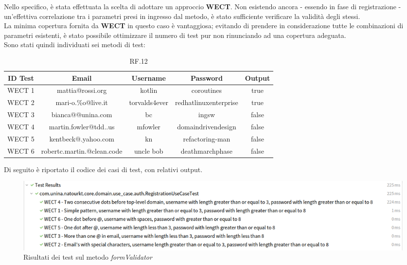 \documentclass{natourDoc}
\begin{document}
Nello specifico, è stata effettuata la scelta di adottare un approccio \textbf{WECT}.
Non esistendo ancora - essendo in fase di registrazione - un'effettiva correlazione tra i parametri presi in ingresso 
dal metodo, è stato sufficiente verificare la validità degli stessi. \\
La minima copertura fornita da \textbf{WECT} in questo caso è vantaggiosa; 
evitando di prendere in considerazione tutte le combinazioni di parametri esistenti, è stato possibile ottimizzare 
il numero di test pur non rinunciando ad una copertura adeguata. \\


Sono stati quindi individuati sei metodi di test:
\begin{table}[H]
	\centering
	\begin{tabularx}{\textwidth}{ |c|c|c|c|c| }
		\hline
		\rowcolor{PineGreen!70}
		\textbf{ID Test} & \textbf{Email}             & \textbf{Username} & \textbf{Password}     & \textbf{Output} \\
		\hline
		WECT 1           & mattia@rossi.org           & kotlin            & coroutines            & true            \\
		\hline
		WECT 2           & mari-o.\%o@live.it          & torvalds4ever     & redhatlinuxenterprise & true            \\
		\hline
		WECT 3           & bianca@@unina.com          & bc                & ingsw                 & false           \\
		\hline
		WECT 4           & martin.fowler@tdd..us       & mfowler           & domaindrivendesign    & false           \\
		\hline
		WECT 5           & kentbeck@.yahoo.com        & kn                & refactoring-man       & false           \\
		\hline
		WECT 6           & robertc.martin.@clean.code & uncle bob         & deathmarchphase       & false           \\
		\hline
	\end{tabularx}
	\caption{RF.12}
\end{table}

Di seguito è riportato il codice dei casi di test, con relativi output.



\begin{figure}[!htbp]
	\centering
	\includegraphics[width=\linewidth]{./code/WECT-result}
	\caption{Risultati dei test sul metodo \textit{formValidator}}
\end{figure}
\end{document}
